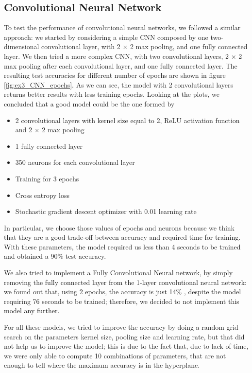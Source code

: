 \documentclass[12pt]{article}
\begin{document}
	\subsection*{Convolutional Neural Network}
	To test the performance of convolutional neural networks, we followed a similar approach: we started by considering a simple CNN composed by one two-dimensional convolutional layer, with 2 $\times$ 2 max pooling, and one fully connected layer.
	We then tried a more complex CNN, with two convolutional layers, 2 $\times$ 2 max pooling after each convolutional layer, and one fully connected layer. The resulting test accuracies for different number of epochs are shown in figure \ref{fig:ex3_CNN_epochs}. As we can see, the model with 2 convolutional layers returns better results with less training epochs. Looking at the plots, we concluded that a good model could be the one formed by 
	\begin{itemize}
		\item 2 convolutional layers with kernel size equal to 2, ReLU activation function and 2 $\times$ 2 max pooling
		\item 1 fully connected layer
		\item 350 neurons for each convolutional layer
		\item Training for 3 epochs
		\item Cross entropy loss
		\item Stochastic gradient descent optimizer with 0.01 learning rate
	\end{itemize}
	In particular, we choose those values of epochs and neurons because we think that they are a good trade-off between accuracy and required time for training.\newline
	With these parameters, the model required us less than 4 seconds to be trained and obtained a 90\% test accuracy.\newline
	
	We also tried to implement a Fully Convolutional Neural network, by simply removing the fully connected layer from the 1-layer convolutional neural network: we found out that, using 2 epochs, the accuracy is just 14\% , despite the model requiring 76 seconds to be trained; therefore, we decided to not implement this model any further.
	
	For all these models, we tried to improve the accuracy by doing a random grid search on the parameters kernel size, pooling size and learning rate, but that did not help us to improve the model; this is due to the fact that, due to lack of time, we were only able to compute 10 combinations of parameters, that are not enough to tell where the maximum accuracy is in the hyperplane.
	
\end{document}
